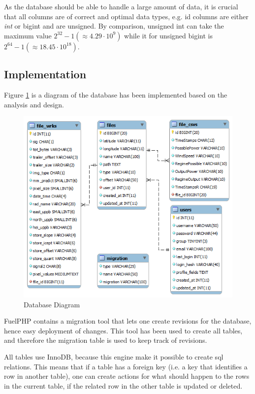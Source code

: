 As the database should be able to handle a large amount of data, it is crucial that all columns are of correct and optimal data types, e.g. \textsf{id} columns are either \textit{int} or \textsf{bigint} and are \textsf{unsigned}. By comparison, \textsf{unsigned int} can take the maximum value $2^{32}-1 (\approx 4.29 \cdot 10^{9})$ while it for \textsf{unsigned bigint} is $ 2^{64}-1 (\approx 18.45 \cdot 10^{18})$.

\subsection{Implementation}
Figure \ref{fig:dbdiagram} is a diagram of the database has been implemented based on the analysis and design.

\begin{figure}[htbp]
   \centering
   \includegraphics[width=1\linewidth]{figure/db}
   \caption{Database Diagram}
   \label{fig:dbdiagram}
\end{figure}

FuelPHP contains a \textsf{migration} tool that lets one create revisions for the database, hence easy deployment of changes. This tool has been used to create all tables, and therefore the \textsf{migration} table is used to keep track of revisions.

All tables use \textsf{InnoDB}, because this engine make it possible to create sql relations. This means that if a table has a foreign key (i.e. a key that identifies a row in another table), one can create actions for what should happen to the rows in the current table, if the related row in the other table is \textsf{updated} or \textsf{deleted}.


